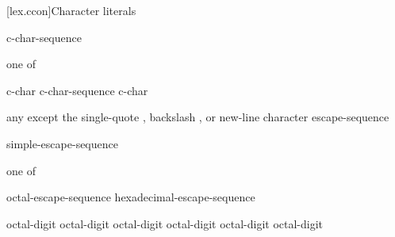 \documentclass{wg21}
\begin{document}
[lex.ccon]{Character literals}

%
\begin{bnf}
    \br
      c-char-sequence 
\end{bnf}

\begin{bnf}
     \textnormal{one of}\br
    \quad{}\quad{}\quad{}
\end{bnf}

\begin{bnf}
    \br
    c-char\br
    c-char-sequence c-char
\end{bnf}

\begin{bnf}
    \br
    \textnormal{any  except the single-quote , backslash \terminal{\textbackslash}, or new-line character}\br
    escape-sequence\br
\end{bnf}

\begin{bnf}
    \br
    simple-escape-sequence\br
    \br
    \br
\end{bnf}

\begin{bnf}
     \textnormal{one of}\br
    \quad{}\quad{}\quad\terminal{\textbackslash\textbackslash}\br
    \quad{}\quad{}\quad{}\quad{}\quad{}\quad{}
\end{bnf}

\begin{addedblock}
\begin{bnf}
\br
    octal-escape-sequence\br
    hexadecimal-escape-sequence\br
\end{bnf}
\end{addedblock}

\begin{bnf}
    \br
    \terminal{\textbackslash} octal-digit\br
    \terminal{\textbackslash} octal-digit octal-digit\br
    \terminal{\textbackslash} octal-digit octal-digit octal-digit
\end{bnf}
\end{document}
